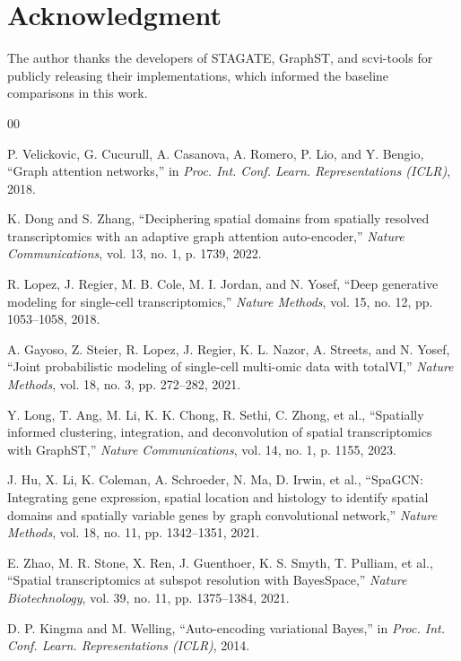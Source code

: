 \documentclass[conference]{IEEEtran}
\begin{document}
\section*{Acknowledgment}

The author thanks the developers of STAGATE, GraphST, and scvi-tools for publicly releasing their implementations, which informed the baseline comparisons in this work.

\begin{thebibliography}{00}

P. Velickovic, G. Cucurull, A. Casanova, A. Romero, P. Lio, and Y. Bengio,
``Graph attention networks,''
in \textit{Proc. Int. Conf. Learn. Representations (ICLR)}, 2018.

K. Dong and S. Zhang,
``Deciphering spatial domains from spatially resolved transcriptomics with an adaptive graph attention auto-encoder,''
\textit{Nature Communications}, vol. 13, no. 1, p. 1739, 2022.

R. Lopez, J. Regier, M. B. Cole, M. I. Jordan, and N. Yosef,
``Deep generative modeling for single-cell transcriptomics,''
\textit{Nature Methods}, vol. 15, no. 12, pp. 1053--1058, 2018.

A. Gayoso, Z. Steier, R. Lopez, J. Regier, K. L. Nazor, A. Streets, and N. Yosef,
``Joint probabilistic modeling of single-cell multi-omic data with totalVI,''
\textit{Nature Methods}, vol. 18, no. 3, pp. 272--282, 2021.

Y. Long, T. Ang, M. Li, K. K. Chong, R. Sethi, C. Zhong, et al.,
``Spatially informed clustering, integration, and deconvolution of spatial transcriptomics with GraphST,''
\textit{Nature Communications}, vol. 14, no. 1, p. 1155, 2023.

J. Hu, X. Li, K. Coleman, A. Schroeder, N. Ma, D. Irwin, et al.,
``SpaGCN: Integrating gene expression, spatial location and histology to identify spatial domains and spatially variable genes by graph convolutional network,''
\textit{Nature Methods}, vol. 18, no. 11, pp. 1342--1351, 2021.

E. Zhao, M. R. Stone, X. Ren, J. Guenthoer, K. S. Smyth, T. Pulliam, et al.,
``Spatial transcriptomics at subspot resolution with BayesSpace,''
\textit{Nature Biotechnology}, vol. 39, no. 11, pp. 1375--1384, 2021.

D. P. Kingma and M. Welling,
``Auto-encoding variational Bayes,''
in \textit{Proc. Int. Conf. Learn. Representations (ICLR)}, 2014.


\end{thebibliography}
\end{document}
